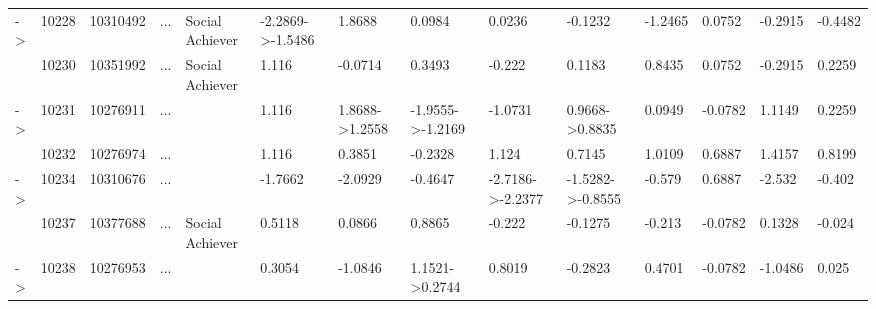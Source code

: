\documentclass[6pt]{article}
\begin{document}
\begin{landscape}
{\begin{longtable}{llllllllllllll}
-\textgreater &10228&10310492&...&Social Achiever&-2.2869-\textgreater -1.5486&1.8688&0.0984&0.0236&-0.1232&-1.2465&0.0752&-0.2915&-0.4482\tabularnewline
&10230&10351992&...&Social Achiever&1.116&-0.0714&0.3493&-0.222&0.1183&0.8435&0.0752&-0.2915&0.2259\tabularnewline
-\textgreater &10231&10276911&...&&1.116&1.8688-\textgreater 1.2558&-1.9555-\textgreater -1.2169&-1.0731&0.9668-\textgreater 0.8835&0.0949&-0.0782&1.1149&0.2259\tabularnewline
&10232&10276974&...&&1.116&0.3851&-0.2328&1.124&0.7145&1.0109&0.6887&1.4157&0.8199\tabularnewline
-\textgreater &10234&10310676&...&&-1.7662&-2.0929&-0.4647&-2.7186-\textgreater -2.2377&-1.5282-\textgreater -0.8555&-0.579&0.6887&-2.532&-0.402\tabularnewline
&10237&10377688&...&Social Achiever&0.5118&0.0866&0.8865&-0.222&-0.1275&-0.213&-0.0782&0.1328&-0.024\tabularnewline
-\textgreater &10238&10276953&...&&0.3054&-1.0846&1.1521-\textgreater 0.2744&0.8019&-0.2823&0.4701&-0.0782&-1.0486&0.025\tabularnewline
\hline
\end{longtable}}\end{landscape}
\end{document}
